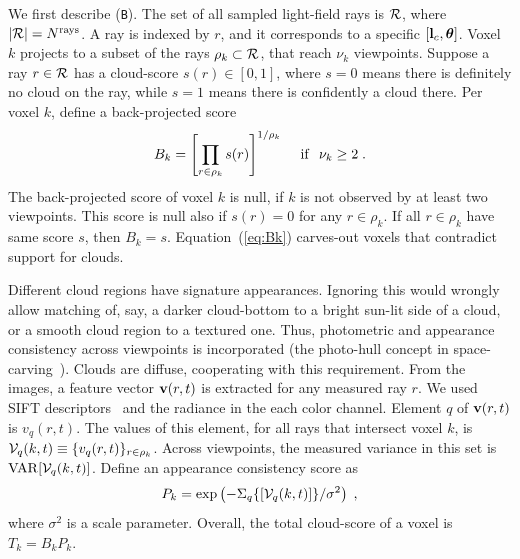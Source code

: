 \documentclass[runningheads]{llncs}
\begin{document}
We first describe ({\tt B}).  The set of all sampled light-field rays is ${\cal R}$, where
\mbox{$|{\cal R}|=N^{\rm rays}$}. A ray is indexed by $r$, and it corresponds to a specific $[{\bf l}_c,{\bm \theta}]$. Voxel $k$ projects to a subset of the rays $\rho_k\subset{\cal R}$,
that reach $\nu_k$ viewpoints. Suppose a ray $r\in{\cal R}$ has a cloud-score $s(r)\in[0,1]$, where $s=0$ means there is definitely no cloud on the ray, while $s=1$ means there is confidently a cloud there. Per voxel $k$, define a back-projected score
\begin{equation}
 B_k= \left[ \prod_{r\in\rho_k} s(r)\right]^{1/\rho_k}
 \;\; ~~{\rm if}~~ \nu_k\geq 2
  \;.
 \label{eq:Bk}
\end{equation}
The back-projected score of voxel $k$ is null, if $k$ is not observed by at least two viewpoints. This score is null also if $s(r)=0$ for any $r\in\rho_k$. If all $r\in\rho_k$ have same score $s$, then $B_k=s$. Equation~(\ref{eq:Bk}) carves-out voxels that contradict support for clouds.

Different cloud regions have signature appearances. Ignoring this would wrongly allow matching of, say, a darker cloud-bottom to a bright sun-lit side of a cloud, or a smooth cloud region to a textured one. Thus, photometric and appearance consistency across viewpoints is incorporated (the photo-hull concept in space-carving~\cite{Kutulakos2000}). Clouds are diffuse, cooperating with this requirement.
From the images, a feature vector ${\bf v}(r,t)$ is extracted for any measured ray $r$.
We used SIFT descriptors~\cite{lowe2004distinctive} and the radiance in the each color channel. Element $q$ of ${\bf v}(r,t)$ is $v_q(r,t)$. The values of this element, for all rays that intersect voxel $k$, is \mbox{${\cal V}_q(k,t)\equiv\{v_q(r,t)\}_{r\in\rho_k}$}.
Across viewpoints, the measured variance in this set is
${\rm VAR}[{\cal V}_q(k,t)]$. Define an appearance consistency score as
\begin{equation}
 P_k= \exp\left(
         -\Sigma_q\{[{\cal V}_q(k,t)]\}/\sigma^2
         \right)
  \;,
 \label{eq:Dist}
\end{equation}
where $\sigma^2$ is a scale parameter. Overall, the total cloud-score of a voxel is $T_k=B_kP_k$.
\end{document}
